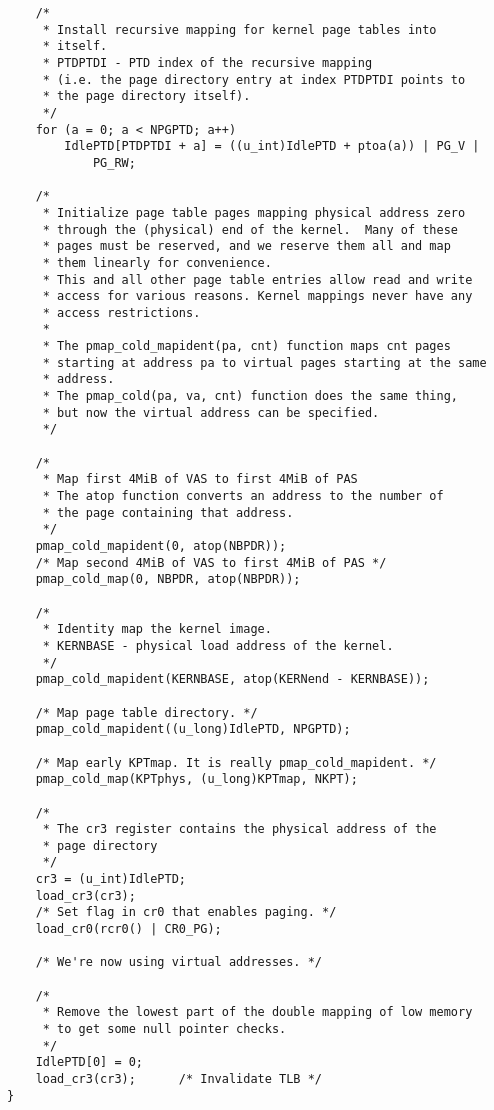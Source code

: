 \documentclass[shortabstract, english]{iithesis}
\newenvironment{code}{}{}
\begin{document}
\begin{code}
\begin{verbatim}
    /*
     * Install recursive mapping for kernel page tables into
     * itself.
     * PTDPTDI - PTD index of the recursive mapping
     * (i.e. the page directory entry at index PTDPTDI points to
     * the page directory itself).
     */
    for (a = 0; a < NPGPTD; a++)
        IdlePTD[PTDPTDI + a] = ((u_int)IdlePTD + ptoa(a)) | PG_V |
            PG_RW;

    /*
     * Initialize page table pages mapping physical address zero
     * through the (physical) end of the kernel.  Many of these
     * pages must be reserved, and we reserve them all and map
     * them linearly for convenience.
     * This and all other page table entries allow read and write
     * access for various reasons. Kernel mappings never have any
     * access restrictions.
     *
     * The pmap_cold_mapident(pa, cnt) function maps cnt pages
     * starting at address pa to virtual pages starting at the same
     * address.
     * The pmap_cold(pa, va, cnt) function does the same thing,
     * but now the virtual address can be specified.
     */

    /*
     * Map first 4MiB of VAS to first 4MiB of PAS
     * The atop function converts an address to the number of
     * the page containing that address.
     */
    pmap_cold_mapident(0, atop(NBPDR));
    /* Map second 4MiB of VAS to first 4MiB of PAS */
    pmap_cold_map(0, NBPDR, atop(NBPDR));

    /*
     * Identity map the kernel image.
     * KERNBASE - physical load address of the kernel.
     */
    pmap_cold_mapident(KERNBASE, atop(KERNend - KERNBASE));

    /* Map page table directory. */
    pmap_cold_mapident((u_long)IdlePTD, NPGPTD);

    /* Map early KPTmap. It is really pmap_cold_mapident. */
    pmap_cold_map(KPTphys, (u_long)KPTmap, NKPT);

    /*
     * The cr3 register contains the physical address of the
     * page directory
     */
    cr3 = (u_int)IdlePTD;
    load_cr3(cr3);
    /* Set flag in cr0 that enables paging. */
    load_cr0(rcr0() | CR0_PG);

    /* We're now using virtual addresses. */

    /*
     * Remove the lowest part of the double mapping of low memory
     * to get some null pointer checks.
     */
    IdlePTD[0] = 0;
    load_cr3(cr3);      /* Invalidate TLB */
}
\end{verbatim}
\end{code}
\end{document}
